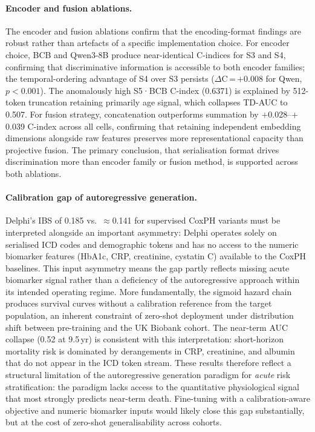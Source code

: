 \paragraph{Encoder and fusion ablations.}
The encoder and fusion ablations confirm that the encoding-format findings are
robust rather than artefacts of a specific implementation choice.
For encoder choice, BCB and Qwen3-8B produce near-identical C-indices for S3
and S4, confirming that discriminative information is accessible to both
encoder families; the temporal-ordering advantage of S4 over S3 persists
($\Delta$C\,=\,$+$0.008 for Qwen, $p<0.001$).
The anomalously high S5·BCB C-index (0.6371) is explained by 512-token
truncation retaining primarily age signal, which collapses TD-AUC to 0.507.
For fusion strategy, concatenation outperforms summation by
$+$0.028--$+$0.039 C-index across all cells, confirming that retaining
independent embedding dimensions alongside raw features preserves more
representational capacity than projective fusion.
The primary conclusion, that serialisation format drives discrimination more
than encoder family or fusion method, is supported across both ablations.

\paragraph{Calibration gap of autoregressive generation.}
Delphi's IBS of 0.185 vs.\ $\approx$0.141 for supervised CoxPH variants
must be interpreted alongside an important asymmetry: Delphi operates solely
on serialised ICD codes and demographic tokens and has no access to the
numeric biomarker features (HbA1c, CRP, creatinine, cystatin C) available to
the CoxPH baselines.
This input asymmetry means the gap partly reflects missing acute biomarker
signal rather than a deficiency of the autoregressive approach within its
intended operating regime.
More fundamentally, the sigmoid hazard chain produces survival curves without
a calibration reference from the target population, an inherent constraint of
zero-shot deployment under distribution shift between pre-training and the
UK Biobank cohort.
The near-term AUC collapse (0.52 at 9.5\,yr) is consistent with this
interpretation: short-horizon mortality risk is dominated by derangements in
CRP, creatinine, and albumin that do not appear in the ICD token stream.
These results therefore reflect a structural limitation of the autoregressive
generation paradigm for \emph{acute} risk stratification: the paradigm
lacks access to the quantitative physiological signal that most strongly
predicts near-term death.
Fine-tuning with a calibration-aware objective and numeric biomarker inputs
would likely close this gap substantially, but at the cost of zero-shot
generalisability across cohorts.

